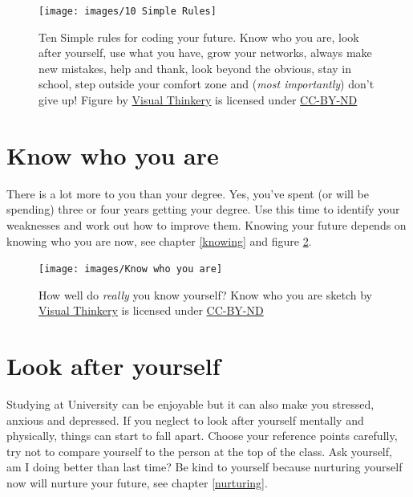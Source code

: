 \documentclass[
]{book}
\begin{document}
\begin{figure}

{\centering \texttt{[image: images/10 Simple Rules]} 

}

\caption{Ten Simple rules for coding your future. Know who you are, look after yourself, use what you have, grow your networks, always make new mistakes, help and thank, look beyond the obvious, stay in school, step outside your comfort zone and (\emph{most importantly}) don't give up! Figure by \href{https://visualthinkery.com/}{Visual Thinkery} is licensed under \href{https://creativecommons.org/licenses/by-nd/4.0/}{CC-BY-ND}}\label{fig:ten-simple-fig}
\end{figure}



\hypertarget{mybrand}{%
\section{Know who you are}\label{mybrand}}

There is a lot more to you than your degree. Yes, you've spent (or will be spending) three or four years getting your degree. Use this time to identify your weaknesses and work out how to improve them. Knowing your future depends on knowing who you are now, see chapter \ref{knowing} and figure \ref{fig:knowing-fig}.

\begin{figure}

{\centering \texttt{[image: images/Know who you are]} 

}

\caption{How well do \emph{really} you know yourself? Know who you are sketch by \href{https://visualthinkery.com}{Visual Thinkery} is licensed under \href{https://creativecommons.org/licenses/by-nd/4.0/}{CC-BY-ND}}\label{fig:knowing-fig}
\end{figure}



\hypertarget{onlyhuman}{%
\section{Look after yourself}\label{onlyhuman}}

Studying at University can be enjoyable but it can also make you stressed, anxious and depressed. If you neglect to look after yourself mentally and physically, things can start to fall apart. Choose your reference points carefully, try not to compare yourself to the person at the top of the class. Ask yourself, am I doing better than last time? Be kind to yourself because nurturing yourself now will nurture your future, see chapter \ref{nurturing}.
\end{document}
